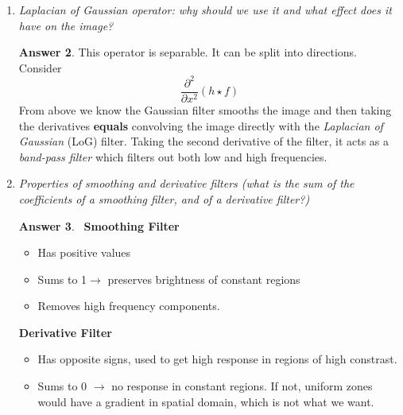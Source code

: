 \documentclass[a4paper,12 pt]{article}
\theoremstyle{definition}
\theoremstyle{remark}
\theoremstyle{definition}
\theoremstyle{definition}
\theoremstyle{definition}
\theoremstyle{definition}
\theoremstyle{remark}
\theoremstyle{remark}
\theoremstyle{definition}
\theoremstyle{definition}
\newtheorem*{answer}{Answer}
\begin{document}
\begin{enumerate}
\begin{answer}
The \textbf{gradient direction} is given as
\begin{equation}
\Theta = \tan^{-1}\left( \frac{\frac{\partial f}{\partial y}}{\frac{\partial f}{\partial x}}\right).
\end{equation}
The \textbf{edge strength} is given by
\begin{equation}
||\nabla f||=\sqrt{(\frac{\partial f}{\partial y})^2+(\frac{\partial f}{\partial y})^2}.
\end{equation}
First smoothing with a Gaussian (or other filter), then taking directional derivative \textbf{equals} convolving image with a Sobel filter = \textit{directional/ oriented} filter or first take directional derivative of the Gaussian filter,the convolve the image with the derivative.
\end{answer}
\item \textit{Laplacian of Gaussian operator: why should we use it and what effect does it have on the image?}
\begin{answer}
This operator is separable. It can be split into directions. Consider
\begin{equation}
\frac{\partial ^2}{\partial x^2}(h \star f)
\end{equation}
From above we know the Gaussian filter smooths the image and then taking the derivatives \textbf{equals} convolving the image directly with the \textit{Laplacian of Gaussian} (LoG) filter. Taking the second derivative of the filter, it acts as a \textit{band-pass filter} which filters out both low and high frequencies.
\end{answer}
\item \textit{Properties of smoothing and derivative filters (what is the sum of the coefficients of a smoothing filter, and of a derivative filter?)}
\begin{answer}
\
\textbf{Smoothing Filter}
\begin{itemize}
\item Has positive values
\item Sums to 1$\rightarrow$ preserves brightness of constant regions
\item Removes high frequency components.
\end{itemize}
\textbf{Derivative Filter}
\begin{itemize}
\item Has opposite signs, used to get high response in regions of high constrast.
\item Sums to 0 $\rightarrow$ no response in constant regions. If not, uniform zones would have a gradient in spatial domain, which is not what we want.

\end{itemize}
\end{answer}
\end{enumerate}
\end{document}
